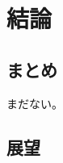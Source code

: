 \chapter{結論}
\label{chap:conclusion}


\section{まとめ}
まだない。



\section{展望}



\begin{comment}

\section{まとめ}

\LaTeX の環境さえあればスタンダードな体裁の論文がたぶんだれでも作れる程度のテンプレートにはなっているはず。がんばって卒業しよう。


\section{大事なこと}

箇条書きで列挙する。

\begin{itemize}
 \item ぐぐる。これは単なる\LaTeX だし、\LaTeX はもう枯れた技術だから、調べれば文献はいくらでもある。
 \item 先生を頼る。
 \item 単位をきちんとる。
 \item 卒業する。
\end{itemize}


\end{comment}